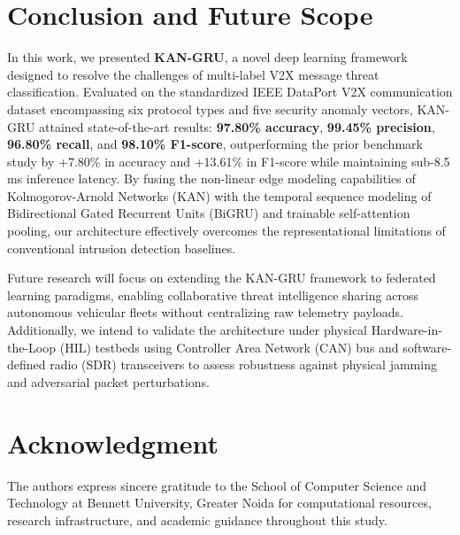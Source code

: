 \documentclass[conference]{IEEEtran}
\begin{document}
\section{Conclusion and Future Scope}
In this work, we presented \textbf{KAN-GRU}, a novel deep learning framework designed to resolve the challenges of multi-label V2X message threat classification. Evaluated on the standardized IEEE DataPort V2X communication dataset encompassing six protocol types and five security anomaly vectors, KAN-GRU attained state-of-the-art results: \textbf{97.80\% accuracy}, \textbf{99.45\% precision}, \textbf{96.80\% recall}, and \textbf{98.10\% F1-score}, outperforming the prior benchmark study by +7.80\% in accuracy and +13.61\% in F1-score while maintaining sub-8.5 ms inference latency. By fusing the non-linear edge modeling capabilities of Kolmogorov-Arnold Networks (KAN) with the temporal sequence modeling of Bidirectional Gated Recurrent Units (BiGRU) and trainable self-attention pooling, our architecture effectively overcomes the representational limitations of conventional intrusion detection baselines.

Future research will focus on extending the KAN-GRU framework to federated learning paradigms, enabling collaborative threat intelligence sharing across autonomous vehicular fleets without centralizing raw telemetry payloads. Additionally, we intend to validate the architecture under physical Hardware-in-the-Loop (HIL) testbeds using Controller Area Network (CAN) bus and software-defined radio (SDR) transceivers to assess robustness against physical jamming and adversarial packet perturbations.

\section*{Acknowledgment}
The authors express sincere gratitude to the School of Computer Science and Technology at Bennett University, Greater Noida for computational resources, research infrastructure, and academic guidance throughout this study.

\balance
\end{document}
